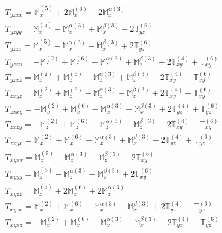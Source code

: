\documentclass[fleqn,8pt,landscape]{jsarticle}
\begin{document}
\begin{align*}
& T_{yzxx} = \mathbb{M}_{x}^{(5)} + 2 \mathbb{M}_{x}^{(6)} + 2 \mathbb{M}_{x}^{\alpha(3)} \\
& T_{yzyy} = \mathbb{M}_{x}^{(5)} - \mathbb{M}_{x}^{\alpha(3)} + \mathbb{M}_{x}^{\beta(3)} - 2 \mathbb{T}_{yz}^{(6)} \\
& T_{yzzz} = \mathbb{M}_{x}^{(5)} - \mathbb{M}_{x}^{\alpha(3)} - \mathbb{M}_{x}^{\beta(3)} + 2 \mathbb{T}_{yz}^{(6)} \\
& T_{yzzx} = - \mathbb{M}_{z}^{(2)} + \mathbb{M}_{z}^{(6)} - \mathbb{M}_{z}^{\alpha(3)} + \mathbb{M}_{z}^{\beta(3)} + 2 \mathbb{T}_{xy}^{(4)} + \mathbb{T}_{xy}^{(6)} \\
& T_{yzxz} = \mathbb{M}_{z}^{(2)} + \mathbb{M}_{z}^{(6)} - \mathbb{M}_{z}^{\alpha(3)} + \mathbb{M}_{z}^{\beta(3)} - 2 \mathbb{T}_{xy}^{(4)} + \mathbb{T}_{xy}^{(6)} \\
& T_{zxyz} = \mathbb{M}_{z}^{(2)} + \mathbb{M}_{z}^{(6)} - \mathbb{M}_{z}^{\alpha(3)} - \mathbb{M}_{z}^{\beta(3)} + 2 \mathbb{T}_{xy}^{(4)} - \mathbb{T}_{xy}^{(6)} \\
& T_{zxxy} = - \mathbb{M}_{x}^{(2)} + \mathbb{M}_{x}^{(6)} - \mathbb{M}_{x}^{\alpha(3)} + \mathbb{M}_{x}^{\beta(3)} + 2 \mathbb{T}_{yz}^{(4)} + \mathbb{T}_{yz}^{(6)} \\
& T_{zxzy} = - \mathbb{M}_{z}^{(2)} + \mathbb{M}_{z}^{(6)} - \mathbb{M}_{z}^{\alpha(3)} - \mathbb{M}_{z}^{\beta(3)} - 2 \mathbb{T}_{xy}^{(4)} - \mathbb{T}_{xy}^{(6)} \\
& T_{zxyx} = \mathbb{M}_{x}^{(2)} + \mathbb{M}_{x}^{(6)} - \mathbb{M}_{x}^{\alpha(3)} + \mathbb{M}_{x}^{\beta(3)} - 2 \mathbb{T}_{yz}^{(4)} + \mathbb{T}_{yz}^{(6)} \\
& T_{xyxx} = \mathbb{M}_{z}^{(5)} - \mathbb{M}_{z}^{\alpha(3)} + \mathbb{M}_{z}^{\beta(3)} - 2 \mathbb{T}_{xy}^{(6)} \\
& T_{xyyy} = \mathbb{M}_{z}^{(5)} - \mathbb{M}_{z}^{\alpha(3)} - \mathbb{M}_{z}^{\beta(3)} + 2 \mathbb{T}_{xy}^{(6)} \\
& T_{xyzz} = \mathbb{M}_{z}^{(5)} + 2 \mathbb{M}_{z}^{(6)} + 2 \mathbb{M}_{z}^{\alpha(3)} \\
& T_{xyzx} = \mathbb{M}_{x}^{(2)} + \mathbb{M}_{x}^{(6)} - \mathbb{M}_{x}^{\alpha(3)} - \mathbb{M}_{x}^{\beta(3)} + 2 \mathbb{T}_{yz}^{(4)} - \mathbb{T}_{yz}^{(6)} \\
& T_{xyxz} = - \mathbb{M}_{x}^{(2)} + \mathbb{M}_{x}^{(6)} - \mathbb{M}_{x}^{\alpha(3)} - \mathbb{M}_{x}^{\beta(3)} - 2 \mathbb{T}_{yz}^{(4)} - \mathbb{T}_{yz}^{(6)}
\end{align*}
\end{document}
